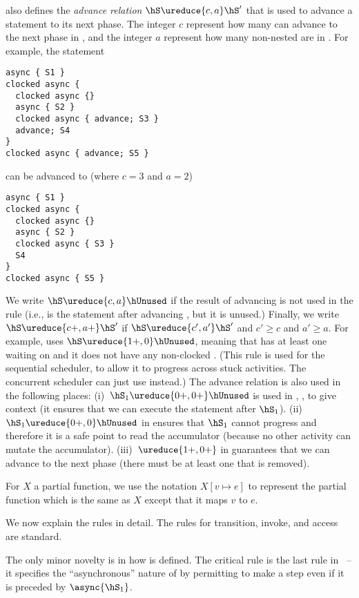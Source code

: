  also defines the \emph{advance relation} $\hS \ureduce{c,a} \hS'$
    that is used to advance a statement to its next phase.
The integer $c$ represent how many  can advance to the next phase in \hS,
    and the integer $a$ represent how many non-nested  are in \hS.
For example, the statement
\begin{lstlisting}
async { S1 }
clocked async {
  clocked async {}
  async { S2 }
  clocked async { advance; S3 }
  advance; S4
}
clocked async { advance; S5 }
\end{lstlisting}
can be advanced to (where $c=3$ and $a=2$)
\begin{lstlisting}
async { S1 }
clocked async {
  clocked async {}
  async { S2 }
  clocked async { S3 }
  S4
}
clocked async { S5 }
\end{lstlisting}
We write  $\hS \ureduce{c,a} \hUnused$ if the result of advancing \hS is not used in the rule
    (i.e., \hUnused is the statement after advancing \hS, but it is unused.)
Finally, we write $\hS \ureduce{c+,a+} \hS'$ if $\hS \ureduce{c',a'} \hS'$ and $c'\geq c$ and $a' \geq a$.
For example,  uses $\hS \ureduce{1+,0} \hUnused$,
    meaning that \hS has at least one  waiting on \xadvance
    and it does not have any non-clocked .
(This rule is used for the sequential scheduler, to allow it to progress across stuck activities.
    The concurrent scheduler can just use  instead.)
The advance relation is also used in the following places:
(i)~$\hS_1 \ureduce{0+,0+} \hUnused$ is used in , , 
    to give context (it ensures that we can execute the statement after $\hS_1$).
(ii)~$\hS_1 \ureduce{0+,0} \hUnused$ in  ensures that $\hS_1$ cannot progress
    and therefore it is a safe point to read the accumulator (because no other activity can mutate the accumulator).
(iii)~$\ureduce{1+,0+}$ in  guarantees that we can advance to the next phase
    (there must be at least one \xadvance that is removed).


For $X$ a partial function, we use the notation
$X[v \mapsto e]$ to represent the partial function which is the same
as $X$ except that it maps $v$ to $e$.

We now explain the rules in detail.
The rules for transition, invoke, and access
are standard.

The only minor novelty is in how \hasync{} is
defined. The critical rule is the last rule in~ -- it
specifies the ``asynchronous'' nature of \hasync{} by permitting \hS{}
to make a step even if it is preceded by $\async{\hS_1}$.

